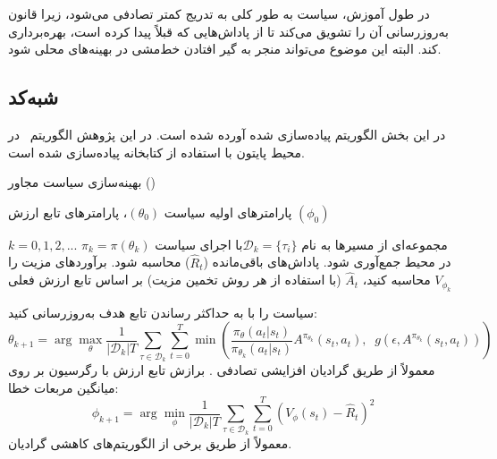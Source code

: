 در طول آموزش، سیاست به طور کلی به تدریج کمتر تصادفی می‌شود، زیرا قانون به‌روزرسانی آن را تشویق می‌کند تا از پاداش‌هایی که قبلاً پیدا کرده است، بهره‌برداری کند. البته این موضوع می‌تواند منجر به گیر افتادن خط‌مشی در بهینه‌های محلی
 شود.
 
 
         \subsection{شبه‌کد}
 
 در این بخش الگوریتم
 پیاده‌سازی شده آورده شده است. در این پژوهش الگوریتم~ در محیط پایتون با استفاده از کتابخانه
   \cite{paszke2017automatic}
  پیاده‌سازی شده ‌است.
 



\vspace{1cm}
\begin{algorithm}[H]
\caption{
	بهینه‌سازی سیاست مجاور  ()
	}\label{alg:PPO}
\begin{algorithmic}[1]
پارامترهای اولیه سیاست
$(\theta_0)$، پارامترهای تابع ارزش
$(\phi_0)$

\For $k = 0,1,2,...$
	\State 
	مجموعه‌ای از مسیرها به نام
	 ${\mathcal D}_k = \{\tau_i\}$ 
		​	
	 با اجرای سیاست 
	 $\pi_k = \pi(\theta_k)$
	 در محیط جمع‌آوری شود.
	\State
	 پاداش‌های باقی‌مانده 
	 ($\hat{R}_t$)
	 محاسبه شود.
	\State
	برآوردهای مزیت را محاسبه کنید، $\hat{A}_t$ (با استفاده از هر روش تخمین مزیت) بر اساس تابع ارزش فعلی $V_{\phi_k}$
	
	\State
	سیاست را با به حداکثر رساندن تابع هدف  به‌روزرسانی کنید:
	 \begin{equation*} \theta_{k+1} = \arg \max_{\theta} \frac{1}{|{\mathcal D}_k| T} \sum_{\tau \in {\mathcal D}_k} \sum_{t=0}^T \min\left( \frac{\pi_{\theta}(a_t|s_t)}{\pi_{\theta_k}(a_t|s_t)} A^{\pi_{\theta_k}}(s_t,a_t), \;\; g(\epsilon, A^{\pi_{\theta_k}}(s_t,a_t)) \right) \end{equation*}
	 معمولاً از طریق گرادیان افزایشی تصادفی .
	 \State
	 برازش تابع ارزش با رگرسیون بر روی میانگین مربعات خطا:
	 \begin{equation*} \phi_{k+1} = \arg \min_{\phi} \frac{1}{|{\mathcal D}_k| T} \sum_{\tau \in {\mathcal D}_k} \sum_{t=0}^T\left( V_{\phi} (s_t) - \hat{R}_t \right)^2 \end{equation*} 
	 معمولاً از طریق برخی از الگوریتم‌های کاهشی گرادیان.
\EndFor
\end{algorithmic}
\end{algorithm}















